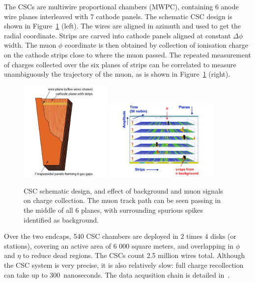 The CSCs are multiwire proportional chambers (MWPC), containing 6
anode wire planes interleaved with 7 cathode panels. The schematic CSC
design is shown in Figure~\ref{fig:mwpc} (left). The wires are
aligned in azimuth and used to get the radial coordinate. Strips are
carved into cathode panels aligned at constant $\Delta\phi$ width. The
muon $\phi$ coordinate is then obtained by collection of ionisation
charge on the cathode strips close to where the muon passed. The
repeated measurement of charges collected over the six planes of
strips can be correlated to measure unambiguously the trajectory of
the muon, as is shown in Figure~\ref{fig:mwpc} (right).


\begin{figure}[htb]
  \begin{center}
    \includegraphics[width=0.4\textwidth]{Chapters/xLHCMS/mwpc.png}
    \includegraphics[width=0.5\textwidth]{Chapters/xLHCMS/mwpcmuon.pdf}
    \caption{CSC schematic design, and effect of background and muon
      signals on charge collection. The
    muon track path can be seen passing in the middle of all 6 planes,
    with surrounding spurious spikes identified as background.}
    \label{fig:mwpc}
  \end{center}
\end{figure}

Over the two endcaps, 540 CSC chambers are deployed in 2 times 4 disks
(or stations), covering an active area of 6 000 square meters, and
overlapping in $\phi$ and $\eta$ to reduce dead regions. The CSCs
count 2.5 million wires total. Although the CSC system is very
precise, it is also relatively slow: full charge recollection can take
up to 300~nanoseconds. The data acqusition chain is detailed in~\cite{Chatrchyan:2008aa}.

